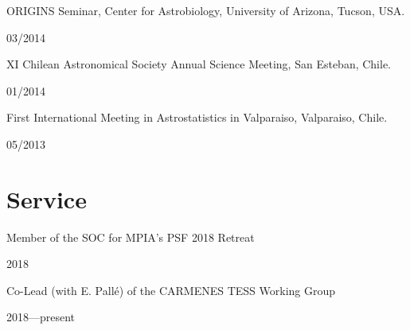 \documentclass[12pt, a4paper]{article} %
\begin{document}
\begin{minipage}[t]{0.7\textwidth}
\begin{flushleft}%
  \setlength{\leftskip}{0.2cm}%
ORIGINS Seminar, Center for Astrobiology, University of Arizona, Tucson, USA.
\end{flushleft}
\end{minipage}
\begin{minipage}[t]{0.3\textwidth}
\hfill 03/2014
\end{minipage}

\begin{minipage}[t]{0.7\textwidth}
\begin{flushleft}%
  \setlength{\leftskip}{0.2cm}%
XI Chilean Astronomical Society Annual Science Meeting, San Esteban, Chile.
\end{flushleft}
\end{minipage}
\begin{minipage}[t]{0.3\textwidth}
\hfill 01/2014
\end{minipage}

\begin{minipage}[t]{0.7\textwidth}
\begin{flushleft}%
  \setlength{\leftskip}{0.2cm}%
First International Meeting in Astrostatistics in Valparaiso, Valparaiso, Chile. 
\end{flushleft}
\end{minipage}
\begin{minipage}[t]{0.3\textwidth}
\hfill 05/2013
\end{minipage}

\section*{Service}

\begin{minipage}[t]{0.7\textwidth}
\begin{flushleft}%
  \setlength{\leftskip}{0.2cm}%
Member of the SOC for MPIA's PSF 2018 Retreat 
\end{flushleft}
\end{minipage}
\begin{minipage}[t]{0.3\textwidth}
\hfill 2018
\end{minipage}

\begin{minipage}[t]{0.7\textwidth}
\begin{flushleft}%
  \setlength{\leftskip}{0.2cm}%
Co-Lead (with E. Pall\'e) of the CARMENES TESS Working Group 
\end{flushleft}
\end{minipage}
\begin{minipage}[t]{0.3\textwidth}
\hfill 2018---present
\end{minipage}
\end{document}

